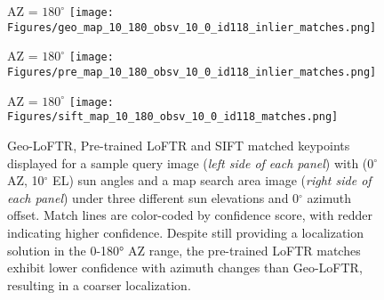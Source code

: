 \begin{figure*}
\begin{minipage}[b]{0.3\linewidth}
\end{minipage}
\begin{minipage}[b]{0.3\linewidth}
    \centering
     \vspace{5pt} 
    AZ = $180^{\circ}$
    \vspace{5pt} 
    \texttt{[image: Figures/geo\_map\_10\_180\_obsv\_10\_0\_id118\_inlier\_matches.png]}
\end{minipage}
\begin{minipage}[b]{0.3\linewidth}
    \centering
     \vspace{5pt} 
    AZ = $180^{\circ}$
    \vspace{5pt} 
    \texttt{[image: Figures/pre\_map\_10\_180\_obsv\_10\_0\_id118\_inlier\_matches.png]}   
\end{minipage}
\begin{minipage}[b]{0.3\linewidth}
    \centering
     \vspace{5pt} 
    AZ = $180^{\circ}$
    \vspace{5pt} 
    \texttt{[image: Figures/sift\_map\_10\_180\_obsv\_10\_0\_id118\_matches.png]}
\end{minipage}

\caption{\label{fig:geo_sift_matched_keypoints_vs_az}Geo-LoFTR, Pre-trained LoFTR and SIFT matched keypoints displayed for a sample query image (\textit{left side of each panel}) with (0$^{\circ}$ AZ, 10$^{\circ}$ EL) sun angles and a map search area image (\textit{right side of each panel}) under three different sun elevations and 0$^{\circ}$ azimuth offset. Match lines are color-coded by confidence score, with redder indicating higher confidence. Despite still providing a localization solution in the 0-180° AZ range, the pre-trained LoFTR matches exhibit lower confidence with azimuth changes than Geo-LoFTR, resulting in a coarser localization.} 
\end{figure*}




